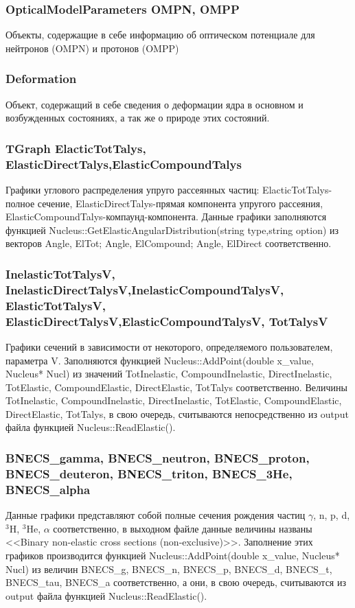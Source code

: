 \documentclass[a4paper,12pt]{extarticle}
\begin{document}
\subsubsection{OpticalModelParameters OMPN, OMPP}
Объекты, содержащие в себе информацию об оптическом потенциале для нейтронов (OMPN) и протонов (OMPP)
\subsubsection{Deformation}
Объект, содержащий в себе сведения о деформации ядра в основном и возбужденных состояниях, а так же о природе этих состояний.
\subsubsection{TGraph ElacticTotTalys, ElasticDirectTalys,ElasticCompoundTalys}
Графики углового распределения упруго рассеянных частиц:  ElacticTotTalys-полное сечение, ElasticDirectTalys-прямая компонента упругого рассеяния, ElasticCompoundTalys-компаунд-компонента. Данные графики заполняются функцией Nucleus::GetElasticAngularDistribution(string type,string option) из векторов Angle, ElTot; Angle, ElCompound; Angle, ElDirect соответственно.
\subsubsection{InelasticTotTalysV, InelasticDirectTalysV,InelasticCompoundTalysV, ElasticTotTalysV, ElasticDirectTalysV,ElasticCompoundTalysV, TotTalysV}
Графики сечений в зависимости от некоторого, определяемого пользователем, параметра V. Заполняются функцией Nucleus::AddPoint(double x_value, Nucleus* Nucl) из значений TotInelastic, CompoundInelastic, DirectInelastic, TotElastic, CompoundElastic, DirectElastic,  TotTalys соответственно. Величины TotInelastic, CompoundInelastic, DirectInelastic, TotElastic, CompoundElastic, DirectElastic,  TotTalys, в свою очередь, считываются непосредственно из output файла функцией Nucleus::ReadElastic().
\subsubsection{BNECS_gamma, BNECS_neutron, BNECS_proton, BNECS_deuteron, BNECS_triton, BNECS_3He, BNECS_alpha}
Данные графики представляют собой полные сечения рождения частиц $\gamma$, n, p, d, $^3$H, $^3$He, $\alpha$ соответственно, в выходном файле данные величины названы <<Binary non-elastic cross sections (non-exclusive)>>. Заполнение этих графиков производится функцией Nucleus::AddPoint(double x_value, Nucleus* Nucl) из величин BNECS_g, BNECS_n, BNECS_p, BNECS_d, BNECS_t, BNECS_tau, BNECS_a соответственно, а они, в свою очередь, считываются из output файла функцией Nucleus::ReadElastic().
\end{document}
